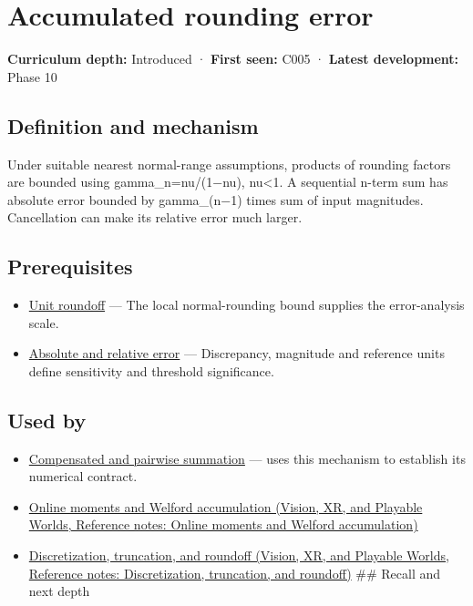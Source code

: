 \hypertarget{appendix-f82e270791c8}{}\label{referencestart:appendix-f82e270791c8}
\section{Accumulated rounding error}\label{appendix-f82e270791c8-accumulated-rounding-error}

\textbf{Curriculum depth:} Introduced · \textbf{First seen:} C005 · \textbf{Latest development:} Phase 10

\subsection{Definition and mechanism}\label{appendix-f82e270791c8-definition-and-mechanism}

Under suitable nearest normal-range assumptions, products of rounding factors are bounded using gamma\_n=nu/(1−nu), nu\textless1. A sequential n-term sum has absolute error bounded by gamma\_(n−1) times sum of input magnitudes. Cancellation can make its relative error much larger.

\subsection{Prerequisites}\label{appendix-f82e270791c8-prerequisites}

\begin{itemize}
\tightlist
\item
  \hyperref[appendix-bc44f7b42f42]{Unit roundoff} --- The local normal-rounding bound supplies the error-analysis scale.
\item
  \hyperref[appendix-3ae74e89b4e6]{Absolute and relative error} --- Discrepancy, magnitude and reference units define sensitivity and threshold significance.
\end{itemize}

\subsection{Used by}\label{appendix-f82e270791c8-used-by}

\begin{itemize}
\item
  \hyperref[appendix-df318da57389]{Compensated and pairwise summation} --- uses this mechanism to establish its numerical contract.
\item
  \href{../07-Vision-XR-and-Playable-Worlds/main.pdf\#nameddest=appendix-33237f0f618b}{Online moments and Welford accumulation (Vision, XR, and Playable Worlds, Reference notes: Online moments and Welford accumulation)}
\item
  \href{../07-Vision-XR-and-Playable-Worlds/main.pdf\#nameddest=appendix-6b0648b2b8e8}{Discretization, truncation, and roundoff (Vision, XR, and Playable Worlds, Reference notes: Discretization, truncation, and roundoff)} \#\# Recall and next depth
\end{itemize}

